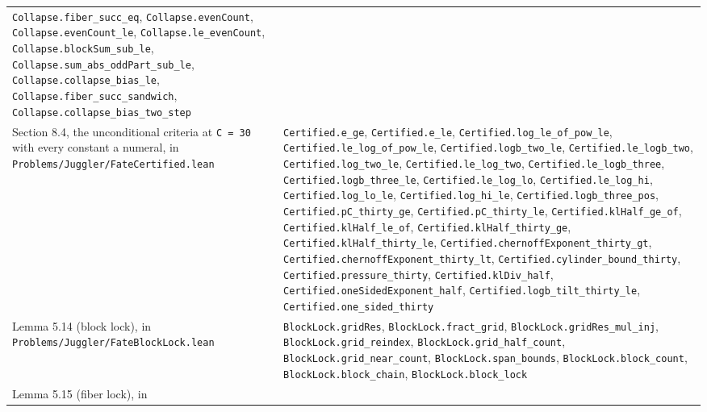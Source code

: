 \documentclass[11pt,a4paper]{article}
\begin{document}
\begin{longtable}[]{@{}
  >{\raggedright\arraybackslash}p{}
  >{\raggedright\arraybackslash}p{}@{}}
\texttt{\nolinkurl{Collapse.fiber_succ_eq}},
\texttt{\nolinkurl{Collapse.evenCount}},
\texttt{\nolinkurl{Collapse.evenCount_le}},
\texttt{\nolinkurl{Collapse.le_evenCount}},
\texttt{\nolinkurl{Collapse.blockSum_sub_le}},
\texttt{\nolinkurl{Collapse.sum_abs_oddPart_sub_le}},
\texttt{\nolinkurl{Collapse.collapse_bias_le}},
\texttt{\nolinkurl{Collapse.fiber_succ_sandwich}},
\texttt{\nolinkurl{Collapse.collapse_bias_two_step}} \\
Section 8.4, the unconditional criteria at \texttt{C\ =\ 30} with every
constant a numeral, in
\texttt{\nolinkurl{Problems/Juggler/FateCertified.lean}} &
\texttt{\nolinkurl{Certified.e_ge}},
\texttt{\nolinkurl{Certified.e_le}},
\texttt{\nolinkurl{Certified.log_le_of_pow_le}},
\texttt{\nolinkurl{Certified.le_log_of_pow_le}},
\texttt{\nolinkurl{Certified.logb_two_le}},
\texttt{\nolinkurl{Certified.le_logb_two}},
\texttt{\nolinkurl{Certified.log_two_le}},
\texttt{\nolinkurl{Certified.le_log_two}},
\texttt{\nolinkurl{Certified.le_logb_three}},
\texttt{\nolinkurl{Certified.logb_three_le}},
\texttt{\nolinkurl{Certified.le_log_lo}},
\texttt{\nolinkurl{Certified.le_log_hi}},
\texttt{\nolinkurl{Certified.log_lo_le}},
\texttt{\nolinkurl{Certified.log_hi_le}},
\texttt{\nolinkurl{Certified.logb_three_pos}},
\texttt{\nolinkurl{Certified.pC_thirty_ge}},
\texttt{\nolinkurl{Certified.pC_thirty_le}},
\texttt{\nolinkurl{Certified.klHalf_ge_of}},
\texttt{\nolinkurl{Certified.klHalf_le_of}},
\texttt{\nolinkurl{Certified.klHalf_thirty_ge}},
\texttt{\nolinkurl{Certified.klHalf_thirty_le}},
\texttt{\nolinkurl{Certified.chernoffExponent_thirty_gt}},
\texttt{\nolinkurl{Certified.chernoffExponent_thirty_lt}},
\texttt{\nolinkurl{Certified.cylinder_bound_thirty}},
\texttt{\nolinkurl{Certified.pressure_thirty}},
\texttt{\nolinkurl{Certified.klDiv_half}},
\texttt{\nolinkurl{Certified.oneSidedExponent_half}},
\texttt{\nolinkurl{Certified.logb_tilt_thirty_le}},
\texttt{\nolinkurl{Certified.one_sided_thirty}} \\
Lemma 5.14 (block lock), in
\texttt{\nolinkurl{Problems/Juggler/FateBlockLock.lean}} &
\texttt{\nolinkurl{BlockLock.gridRes}},
\texttt{\nolinkurl{BlockLock.fract_grid}},
\texttt{\nolinkurl{BlockLock.gridRes_mul_inj}},
\texttt{\nolinkurl{BlockLock.grid_reindex}},
\texttt{\nolinkurl{BlockLock.grid_half_count}},
\texttt{\nolinkurl{BlockLock.grid_near_count}},
\texttt{\nolinkurl{BlockLock.span_bounds}},
\texttt{\nolinkurl{BlockLock.block_count}},
\texttt{\nolinkurl{BlockLock.block_chain}},
\texttt{\nolinkurl{BlockLock.block_lock}} \\
Lemma 5.15 (fiber lock), in

\end{longtable}
\end{document}
